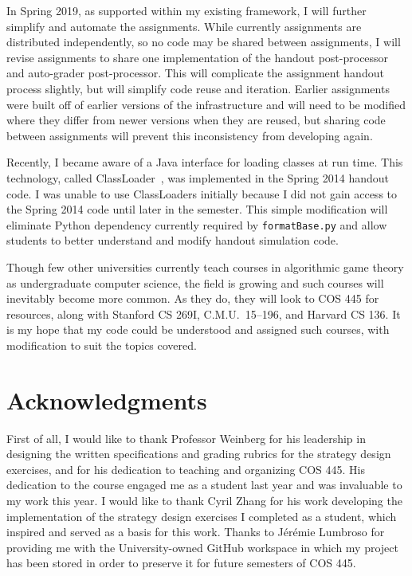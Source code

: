 \documentclass[pageno]{jpaper}
\begin{document}
In Spring 2019, as supported within my existing framework, I will further simplify and automate the assignments.
While currently assignments are distributed independently, so no code may be shared between assignments, I will revise assignments to share one implementation of the handout post-processor and auto-grader post-processor.
This will complicate the assignment handout process slightly, but will simplify code reuse and iteration.
Earlier assignments were built off of earlier versions of the infrastructure and will need to be modified where they differ from newer versions when they are reused, but sharing code between assignments will prevent this inconsistency from developing again.

Recently, I became aware of a Java interface for loading classes at run time.
This technology, called ClassLoader~\cite{classloader}, was implemented in the Spring 2014 handout code.
I was unable to use ClassLoaders initially because I did not gain access to the Spring 2014 code until later in the semester.
This simple modification will eliminate Python dependency currently required by \texttt{formatBase.py} and allow students to better understand and modify handout simulation code.

Though few other universities currently teach courses in algorithmic game theory as undergraduate computer science, the field is growing and such courses will inevitably become more common.
As they do, they will look to COS 445 for resources, along with Stanford CS 269I, C.M.U.\ 15--196, and Harvard CS 136.
It is my hope that my code could be understood and assigned such courses, with modification to suit the topics covered.

\section*{Acknowledgments}
First of all, I would like to thank Professor Weinberg for his leadership in designing the written specifications and grading rubrics for the strategy design exercises, and for his dedication to teaching and organizing COS 445.
His dedication to the course engaged me as a student last year and was invaluable to my work this year.
I would like to thank Cyril Zhang for his work developing the implementation of the strategy design exercises I completed as a student, which inspired and served as a basis for this work.
Thanks to J\'er\'emie Lumbroso for providing me with the University-owned GitHub workspace in which my project has been stored in order to preserve it for future semesters of COS 445.
\end{document}
